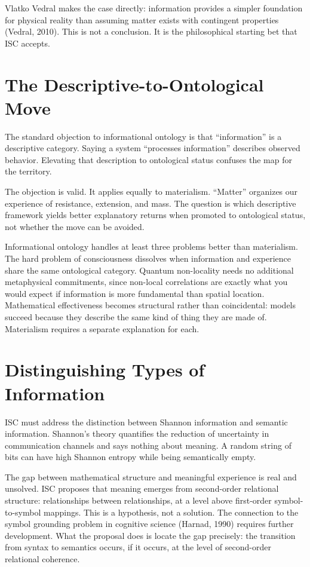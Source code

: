 \documentclass[12pt]{article}
\begin{document}
Vlatko Vedral makes the case directly: information provides a simpler
foundation for physical reality than assuming matter exists with
contingent properties (Vedral, 2010). This is not a conclusion. It is
the philosophical starting bet that ISC accepts.

\section{The Descriptive-to-Ontological
Move}\label{the-descriptive-to-ontological-move}

The standard objection to informational ontology is that ``information''
is a descriptive category. Saying a system ``processes information''
describes observed behavior. Elevating that description to ontological
status confuses the map for the territory.

The objection is valid. It applies equally to materialism. ``Matter''
organizes our experience of resistance, extension, and mass. The
question is which descriptive framework yields better explanatory
returns when promoted to ontological status, not whether the move can be
avoided.

Informational ontology handles at least three problems better than
materialism. The hard problem of consciousness dissolves when
information and experience share the same ontological category. Quantum
non-locality needs no additional metaphysical commitments, since
non-local correlations are exactly what you would expect if information
is more fundamental than spatial location. Mathematical effectiveness
becomes structural rather than coincidental: models succeed because they
describe the same kind of thing they are made of. Materialism requires a
separate explanation for each.

\section{Distinguishing Types of
Information}\label{distinguishing-types-of-information}

ISC must address the distinction between Shannon information and
semantic information. Shannon's theory quantifies the reduction of
uncertainty in communication channels and says nothing about meaning. A
random string of bits can have high Shannon entropy while being
semantically empty.

The gap between mathematical structure and meaningful experience is real
and unsolved. ISC proposes that meaning emerges from second-order
relational structure: relationships between relationships, at a level
above first-order symbol-to-symbol mappings. This is a hypothesis, not a
solution. The connection to the symbol grounding problem in cognitive
science (Harnad, 1990) requires further development. What the proposal
does is locate the gap precisely: the transition from syntax to
semantics occurs, if it occurs, at the level of second-order relational
coherence.
\end{document}

